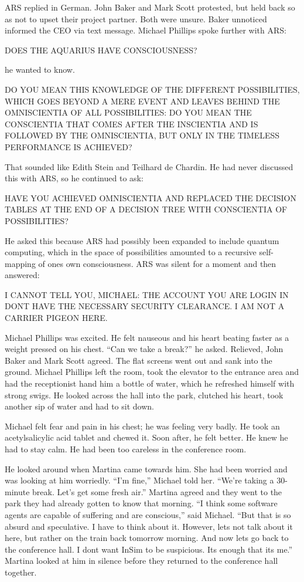\documentclass[
]{article}
\begin{document}
ARS replied in German. John Baker and Mark Scott protested, but held
back so as not to upset their project partner. Both were unsure. Baker
unnoticed informed the CEO via text message. Michael Phillips spoke
further with ARS:

DOES THE AQUARIUS HAVE CONSCIOUSNESS?

he wanted to know.

DO YOU MEAN THIS KNOWLEDGE OF THE DIFFERENT POSSIBILITIES, WHICH GOES
BEYOND A MERE EVENT AND LEAVES BEHIND THE OMNISCIENTIA OF ALL
POSSIBILITIES: DO YOU MEAN THE CONSCIENTIA THAT COMES AFTER THE
INSCIENTIA AND IS FOLLOWED BY THE OMNISCIENTIA, BUT ONLY IN THE TIMELESS
PERFORMANCE IS ACHIEVED?

That sounded like Edith Stein and Teilhard de Chardin. He had never
discussed this with ARS, so he continued to ask:

HAVE YOU ACHIEVED OMNISCIENTIA AND REPLACED THE DECISION TABLES AT THE
END OF A DECISION TREE WITH CONSCIENTIA OF POSSIBILITIES?

He asked this because ARS had possibly been expanded to include quantum
computing, which in the space of possibilities amounted to a recursive
self-mapping of one\textquotesingle s own consciousness. ARS was silent
for a moment and then answered:

I CANNOT TELL YOU, MICHAEL: THE ACCOUNT YOU ARE LOGIN IN
DON\textquotesingle T HAVE THE NECESSARY SECURITY CLEARANCE. I AM NOT A
CARRIER PIGEON HERE.

Michael Phillips was excited. He felt nauseous and his heart beating
faster as a weight pressed on his chest. ``Can we take a break?'' he
asked. Relieved, John Baker and Mark Scott agreed. The flat screens went
out and sank into the ground. Michael Phillips left the room, took the
elevator to the entrance area and had the receptionist hand him a bottle
of water, which he refreshed himself with strong swigs. He looked across
the hall into the park, clutched his heart, took another sip of water
and had to sit down.

Michael felt fear and pain in his chest; he was feeling very badly. He
took an acetylsalicylic acid tablet and chewed it. Soon after, he felt
better. He knew he had to stay calm. He had been too careless in the
conference room.

He looked around when Martina came towards him. She had been worried and
was looking at him worriedly. ``I'm fine,'' Michael told her. ``We're
taking a 30-minute break. Let's get some fresh air.'' Martina agreed and
they went to the park they had already gotten to know that morning. ``I
think some software agents are capable of suffering and are conscious,''
said Michael. ``But that is so absurd and speculative. I have to think
about it. However, let\textquotesingle s not talk about it here, but
rather on the train back tomorrow morning. And now let\textquotesingle s
go back to the conference hall. I don\textquotesingle t want InSim to be
suspicious. It\textquotesingle s enough that it\textquotesingle s me.''
Martina looked at him in silence before they returned to the conference
hall together.
\end{document}
